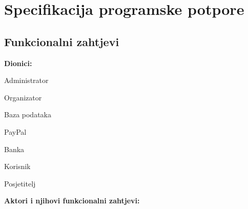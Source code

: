 \chapter{Specifikacija programske potpore}
		
	\section{Funkcionalni zahtjevi}

			
			\noindent \textbf{Dionici:}
			
			\begin{packed_enum}
				
				\item Administrator
				\item Organizator				
				\item Baza podataka
				\item PayPal
				\item Banka
				\item Korisnik
				\item Posjetitelj
				
			\end{packed_enum}
			
			\noindent \textbf{Aktori i njihovi funkcionalni zahtjevi:}
			
